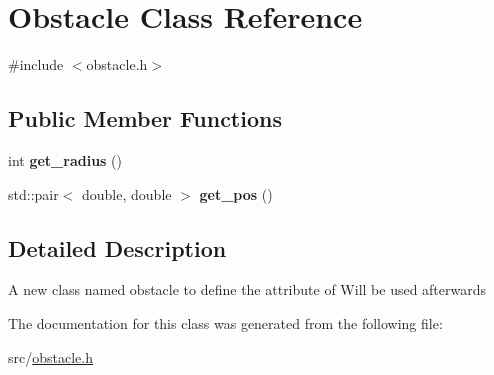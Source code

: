 \hypertarget{classObstacle}{}\section{Obstacle Class Reference}
\label{classObstacle}


{\ttfamily \#include $<$obstacle.\+h$>$}

\subsection*{Public Member Functions}
\begin{DoxyCompactItemize}
\item 
int {\bfseries get\+\_\+radius} ()\hypertarget{classObstacle_aa03143fb98cf3fe4f4fb67d1b450b33f}{}\label{classObstacle_aa03143fb98cf3fe4f4fb67d1b450b33f}

\item 
std\+::pair$<$ double, double $>$ {\bfseries get\+\_\+pos} ()\hypertarget{classObstacle_ae2ad95c346f74759b348ecd70afce364}{}\label{classObstacle_ae2ad95c346f74759b348ecd70afce364}

\end{DoxyCompactItemize}


\subsection{Detailed Description}
A new class named obstacle to define the attribute of Will be used afterwards 

The documentation for this class was generated from the following file\+:\begin{DoxyCompactItemize}
\item 
src/\hyperlink{obstacle_8h}{obstacle.\+h}\end{DoxyCompactItemize}
